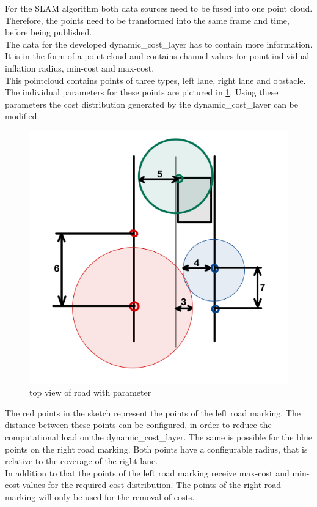 For the SLAM algorithm both data sources need to be fused into one point cloud. Therefore, the points need to be transformed into the same frame and time, before being published.\\

The data for the developed dynamic\_cost\_layer has to contain more information. It is in the form of a point cloud and contains channel values for point individual inflation radius, min-cost and max-cost.\\ 

This pointcloud contains points of three types, left lane, right lane and obstacle.
The individual parameters for these points are pictured in \ref{markparams}. Using these parameters the cost distribution generated by the dynamic\_cost\_layer can be modified.\\

\begin{figure}[H]
	\centering
	\includegraphics[width=.7\textwidth]{Pictures/markfreespace parameter erklaerung}
	\caption{top view of road with parameter}
	\label{markparams}
\end{figure}

The red points in the sketch represent the points of the left road marking. The distance between these points can be configured, in order to reduce the computational load on the dynamic\_cost\_layer. The same is possible for the blue points on the right road marking. Both points have a configurable radius, that is relative to the coverage of the right lane.\\
In addition to that the points of the left road marking receive max-cost and min-cost values for the required cost distribution. The points of the right road marking will only be used for the removal of costs.\\

